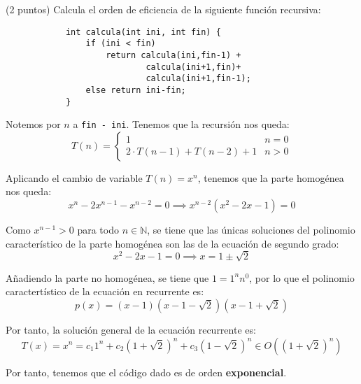 \documentclass[12pt]{article}
\begin{document}
    \begin{ejercicio}
        (2 puntos) Calcula el orden de eficiencia de la siguiente función recursiva:

        \begin{verbatim}
            int calcula(int ini, int fin) {
                if (ini < fin)
                    return calcula(ini,fin-1) + 
                            calcula(ini+1,fin)+
                            calcula(ini+1,fin-1);
                else return ini-fin;
            }
        \end{verbatim}

        Notemos por $n$ a \verb|fin - ini|. Tenemos que la recursión 
        nos queda:
        \begin{equation*}
            T(n) = \left \{ \begin{array}{lcc} 
                1 & n = 0  \\ 
                2 \cdot T(n-1) + T(n-2) + 1 & n > 0
            \end{array} \right .
        \end{equation*}

        Aplicando el cambio de variable $T(n) = x^{n}$, tenemos 
        que la parte homogénea nos queda:
        \begin{equation*}
            x^{n} - 2x^{n-1} - x^{n-2} = 0 
            \implies x^{n-2}(x^{2} - 2x - 1) = 0
        \end{equation*}

        Como $x^{n-1} > 0$ para todo $n \in \mathbb{N}$, 
        se tiene que las únicas
         soluciones del
        polinomio característico de la parte homogénea son las de la ecuación de 
        segundo grado:
        \begin{equation*}
            x^{2} - 2x - 1 = 0 \implies x = 1 \pm \sqrt{2}
        \end{equation*}
        
        Añadiendo
        la parte no homogénea, se tiene que $1 = 1^{n}n^{0}$, 
        por lo que el polinomio
        caractertístico de la ecuación en recurrente es:
        \begin{equation*}
            p(x) = (x - 1)(x - 1 - \sqrt{2})(x - 1 + \sqrt{2})
        \end{equation*}

        Por tanto, la solución general de la ecuación 
        recurrente es:
        \begin{equation*}
            T(x) = x^{n} = c_{1}1^{n} + 
                            c_{2}(1 + \sqrt{2})^{n} + 
                            c_{3}(1 - \sqrt{2})^{n} 
                            \in O((1 + \sqrt{2})^{n})
        \end{equation*}

        Por tanto, tenemos que el código dado es de orden 
        \textbf{exponencial}.
    \end{ejercicio}
\end{document}
